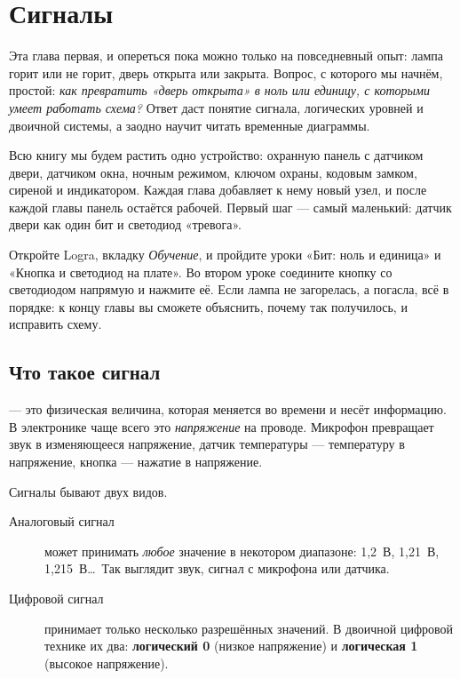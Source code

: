 \chapter{Сигналы}
\label{ch:signals}

Эта глава первая, и опереться пока можно только на повседневный опыт: лампа
горит или не горит, дверь открыта или закрыта. Вопрос, с которого мы
начнём, простой: \emph{как превратить «дверь открыта» в ноль или единицу, с
которыми умеет работать схема?} Ответ даст понятие сигнала, логических
уровней и двоичной системы, а заодно научит читать временные диаграммы.

\begin{infobox}
Всю книгу мы будем растить одно устройство: охранную панель с датчиком
двери, датчиком окна, ночным режимом, ключом охраны, кодовым замком, сиреной
и индикатором. Каждая глава добавляет к нему новый узел, и после каждой
главы панель остаётся рабочей. Первый шаг --- самый маленький: датчик двери
как один бит и светодиод «тревога».
\end{infobox}

\begin{buildbox}
Откройте Logra, вкладку \emph{Обучение}, и пройдите уроки «Бит: ноль и
единица» и «Кнопка и светодиод на плате». Во втором уроке соедините кнопку
со светодиодом напрямую и нажмите её. Если лампа не загорелась, а погасла,
всё в порядке: к концу главы вы сможете объяснить, почему так получилось, и
исправить схему.
\end{buildbox}

\section{Что такое сигнал}

 --- это физическая величина, которая меняется во времени и
несёт информацию. В электронике чаще всего это \emph{напряжение} на проводе.
Микрофон превращает звук в изменяющееся напряжение, датчик температуры ---
температуру в напряжение, кнопка --- нажатие в напряжение.

Сигналы бывают двух видов.

\begin{description}
  \item[Аналоговый сигнал] может принимать \emph{любое} значение в некотором
    диапазоне: 1,2~В, 1,21~В, 1,215~В\ldots\ Так выглядит звук, сигнал с
    микрофона или датчика.
  \item[Цифровой сигнал] принимает только несколько разрешённых значений. В
    двоичной цифровой технике их два: \textbf{логический 0} (низкое
    напряжение) и \textbf{логическая 1} (высокое напряжение).
\end{description}

